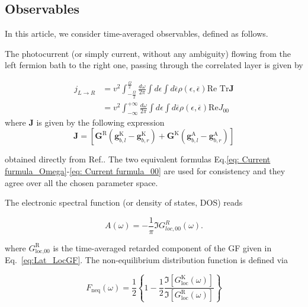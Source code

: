 \documentclass[aps,prb,groupedaddress,showpacs,twocolumn,superscriptaddress,10pt]{revtex4-2}
\begin{document}
\subsection{Observables}
\label{sec:observables}  
 
	  
In this article, we consider time-averaged observables, defined as follows.

The photocurrent (or simply current, without any ambiguity) flowing from the left fermion bath to the right one, passing through the correlated layer is given by 


\begin{align}
 j_{L\rightarrow R}&=v^2\int_{-\frac{\Omega}{2}}^{\frac{\Omega}{2}}\frac{d\omega}{2\pi} \int d\epsilon \int d\overline{\epsilon} \rho(\epsilon,\overline{\epsilon}) \text{Re Tr} \boldsymbol{J}\label{eq: Current furmula_Omega}\\
  &= v^2\int_{-\infty}^{+\infty}\frac{d\omega}{2\pi} \int d\epsilon \int d\overline{\epsilon} \rho(\epsilon,\overline{\epsilon}) \text{Re} J_{00}\label{eq: Current furmula_00}
  \end{align} 
where $\boldsymbol{J}$ is given by the following expression
\begin{equation}
  \boldsymbol{J}=\left[\boldsymbol{G}^{\text{R}}(\boldsymbol{g}_{b,l}^{\text{K}}-\boldsymbol{g}_{b,r}^{\text{K}})+\boldsymbol{G}^{\text{K}}(\boldsymbol{g}_{b,l}^{\text{A}}-\boldsymbol{g}_{b,r}^{\text{A}})\right]
\end{equation}

obtained directly from Ref.\cite{so.do.18}. The two equivalent formulas Eq.\eqref{eq: Current furmula_Omega}-\eqref{eq: Current furmula_00} are used for consistency and they agree over all the chosen parameter space. 

The electronic spectral function (or density of states, DOS) reads

\begin{equation}
\label{eq:el_spectral_function}
 A(\omega)=-\frac{1}{\pi}\Im G_{loc,00}^{R}(\omega).
\end{equation}

where $G^{\text{R}}_{\text{loc,00}}$ is the time-averaged retarded component of the GF given in Eq.~\eqref{eq:Lat_LocGF}. The non-equilibrium distribution function is defined via

\begin{equation}
\label{eq:NEFD-dist}
F_{\text{neq}}(\omega) = \frac{1}{2} \left\{1 - \frac{1}{2}\frac{\Im[G^{\text{K}}_{\text{loc}}(\omega)]}{\Im[G^{\text{R}}_{\text{loc}}(\omega)]} \right\}
\end{equation}
\end{document}
